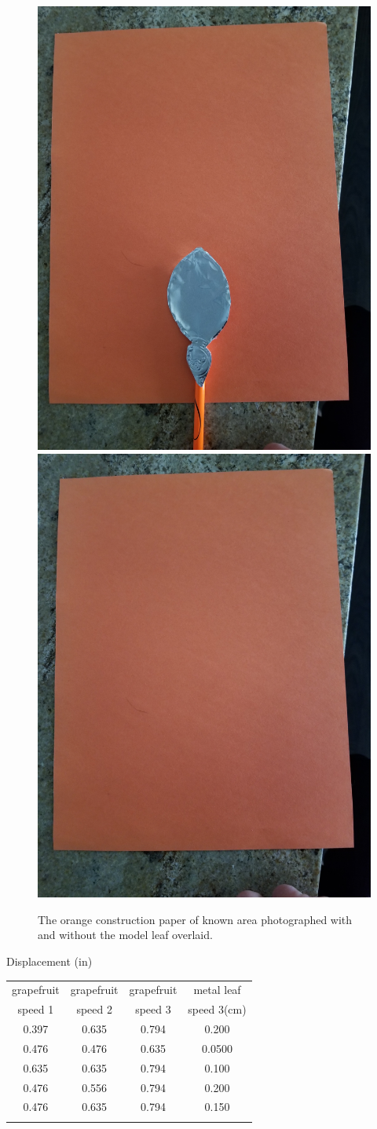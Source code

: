 \documentclass[]{article}
\begin{document}
\begin{figure}
\begin{center}
\includegraphics[width=0.33\columnwidth]{MetalLeaf.jpg}
\includegraphics[width=0.33\columnwidth]{Paper.jpg}
\end{center}
\caption{The orange construction paper of known area photographed with and without the model leaf overlaid.}
\label{fig:Appendix2}
\end{figure}
\begin{table}
\begin{center}
Displacement (\si{in})\\
\begin{tabular}{cccc}
\toprule
grapefruit & grapefruit & grapefruit & metal leaf \\
speed 1 & speed 2 & speed 3 & speed 3(cm) \\ 
\midrule
0.397 & 0.635 & 0.794 & 0.200 \\
0.476 & 0.476 & 0.635 & 0.0500 \\
0.635 & 0.635 & 0.794 & 0.100 \\
0.476 & 0.556 & 0.794 & 0.200 \\
0.476 & 0.635 & 0.794 & 0.150 \\
\label{tb2:Table2}
\bottomrule
\end{tabular}
\end{center}
\end{table}
\end{document}
